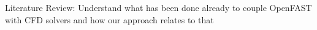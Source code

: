 Literature Review: Understand what has been done already to couple OpenFAST with CFD solvers and how our approach relates to that
\\

